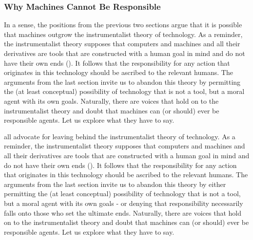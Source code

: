 \documentclass{article}
\begin{document}



\subsubsection{Why Machines Cannot Be Responsible}
%


In a sense, the positions from the previous two sections argue that it is
possible that machines outgrow the instrumentalist theory of technology. As a
reminder, the instrumentalist theory supposes that computers and machines and
all their derivatives are tools that are constructed with a human goal in mind
and do not have their own ends (\cite[p. 308]{gunkel2020mind}). It follows that
the responsibility for any action that originates in this technology should be
ascribed to the relevant humans. The arguments from the last section invite us
to abandon this theory by permitting the (at least conceptual)
possibility of technology that is not a tool, but a moral agent with its own
goals. Naturally, there are voices that hold on to the instrumentalist
theory and doubt that machines can (or should) ever be responsible agents. Let
us explore what they have to say.


all advocate for leaving behind
the instrumentalist theory of technology. As a reminder, the instrumentalist theory
supposes that computers and machines and all their derivatives are tools
that are constructed with a human goal in mind and do not have their own ends
(\cite[p. 308]{gunkel2020mind}). It follows that the responsibility for any
action that originates in this technology should be ascribed to the relevant
humans. The arguments from the last section invite us to abandon this 
theory by either permitting the (at least conceptual) possibility of technology
that is not a tool, but a moral agent with its own goals - or denying that
responsibility necessarily falls onto those who set the ultimate ends.
Naturally, there are voices that hold on to the instrumentalist theory and doubt
that machines can (or should) ever be responsible agents. Let us explore what
they have to say.
\end{document}
